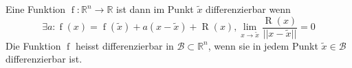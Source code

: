 Eine Funktion $\operatorname{f} : \mathbb{R}^n \to \mathbb{R}$ ist dann im Punkt $\tilde{x}$ differenzierbar wenn
$$\exists a : \operatorname{f}(x) = \operatorname{f}(\tilde{x}) + a(x - \tilde{x}) + \operatorname{R}(x), \lim\limits_{x \to \tilde{x}} \frac{\operatorname{R}(x)}{|| x - \tilde{x} || } = 0$$
Die Funktion $\operatorname{f}$ heisst differenzierbar in $\mathcal{B} \subset \mathbb{R}^n$, wenn sie in jedem Punkt $\tilde{x} \in \mathcal{B}$ differenzierbar ist.

